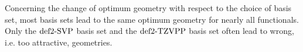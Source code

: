 \documentclass[8.5pt,twoside,twocolumn]{article}
\newcommand\eint{\enmat{E^{\te{int}}}}
\newcommand\kmo{\enmat{\te {kJ/mol}}}
\theoremstyle{standard}
\begin{document}
Concerning the change of optimum geometry with respect to the choice of basis set, most
basis sets lead to the same optimum geometry for nearly all functionals. Only the
$\text{def2-SVP}$ basis set and the $\text{def2-TZVPP}$ basis set often lead to wrong, i.e. too
attractive, geometries. 

% 
\end{document}
